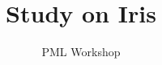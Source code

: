 \documentclass{article}
\title{Study on Iris}
\author{PML Workshop}
\begin{document}
\begin{titlingpage}
    \maketitle
    \centering
    \centering
\end{titlingpage}
\blinddocument
\end{document}
